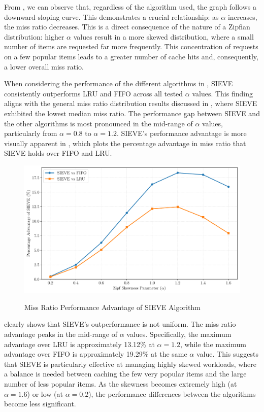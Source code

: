 From , we can observe that, regardless of the algorithm used, the graph follows a downward-sloping curve. This demonstrates a crucial relationship: as $\alpha$ increases, the miss ratio decreases. This is a direct consequence of the nature of a Zipfian distribution: higher $\alpha$ values result in a more skewed distribution, where a small number of items are requested far more frequently. This concentration of requests on a few popular items leads to a greater number of cache hits and, consequently, a lower overall miss ratio.

When considering the performance of the different algorithms in , SIEVE consistently outperforms LRU and FIFO across all tested $\alpha$ values. This finding aligns with the general miss ratio distribution results discussed in , where SIEVE exhibited the lowest median miss ratio. The performance gap between SIEVE and the other algorithms is most pronounced in the mid-range of $\alpha$ values, particularly from $\alpha=0.8$ to $\alpha=1.2$. SIEVE's performance advantage is more visually apparent in , which plots the percentage advantage in miss ratio that SIEVE holds over FIFO and LRU.

\begin{figure}[h!]
    \centering
    \caption{Miss Ratio Performance Advantage of SIEVE Algorithm}
    \includegraphics[width=0.8\linewidth]{figures/simulations/sieve_advantage_no_title.pdf}
    \label{fig:sieve-advantage}
\end{figure}

 clearly shows that SIEVE's outperformance is not uniform. The miss ratio advantage peaks in the mid-range of $\alpha$ values. Specifically, the maximum advantage over LRU is approximately 13.12\% at $\alpha=1.2$, while the maximum advantage over FIFO is approximately 19.29\% at the same $\alpha$ value. This suggests that SIEVE is particularly effective at managing highly skewed workloads, where a balance is needed between caching the few very popular items and the large number of less popular items. As the skewness becomes extremely high (at $\alpha=1.6$) or low (at $\alpha=0.2$), the performance differences between the algorithms become less significant.

